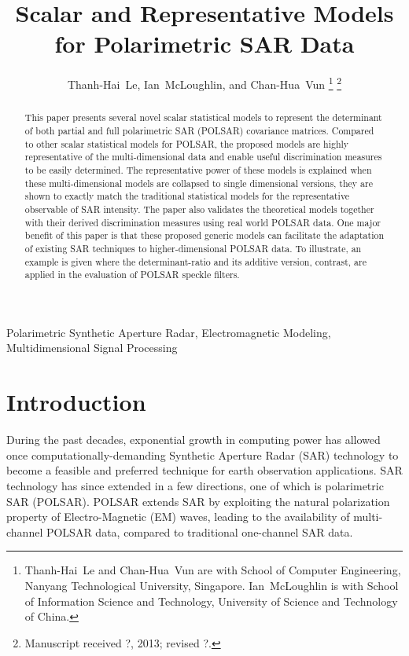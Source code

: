 \documentclass[journal,12pt,draftcls,onecolumn]{IEEEtran}
\title{
  Scalar and Representative Models for Polarimetric SAR Data
}
\author{Thanh-Hai~Le,
        Ian~McLoughlin, 
	and Chan-Hua~Vun%
\thanks{Thanh-Hai~Le and Chan-Hua~Vun are with School of Computer Engineering, 
Nanyang Technological University, Singapore. Ian~McLoughlin is with School of Information Science and Technology,
University of Science and Technology of China.
}%
\thanks{Manuscript received ?, 2013; revised ?.}}
\begin{document}
\maketitle

\begin{abstract}
This paper presents several novel scalar statistical models to represent the determinant of both partial and full polarimetric SAR (POLSAR) covariance matrices.
Compared to other scalar statistical models for POLSAR,
  the proposed models are highly representative of the multi-dimensional data
  and enable useful discrimination measures to be easily determined. %
The representative power of these models is explained  
when these multi-dimensional models are collapsed to single dimensional versions,
  they are shown to exactly match the traditional statistical models for the representative observable of SAR intensity.
The paper also validates the theoretical models together with their derived discrimination measures using real world POLSAR data.  
One major benefit of this paper is that these proposed generic models can facilitate the adaptation of existing SAR techniques to higher-dimensional POLSAR data.
To illustrate, an example is given where the determinant-ratio and its additive version, contrast, are applied in the evaluation of POLSAR speckle filters.
\end{abstract}

\begin{IEEEkeywords}
Polarimetric Synthetic Aperture Radar, Electromagnetic Modeling, Multidimensional Signal Processing  
\end{IEEEkeywords}

\IEEEpeerreviewmaketitle

\section{Introduction}

During the past decades, exponential growth in computing power has allowed once computationally-demanding Synthetic Aperture Radar (SAR)
technology to become a feasible and preferred technique for earth observation applications.
SAR technology has since extended in a few directions, one of which is polarimetric SAR (POLSAR).
POLSAR extends SAR by exploiting the natural polarization property of Electro-Magnetic (EM) waves,
  leading to the availability of multi-channel POLSAR data, compared to traditional one-channel SAR data.
\end{document}
